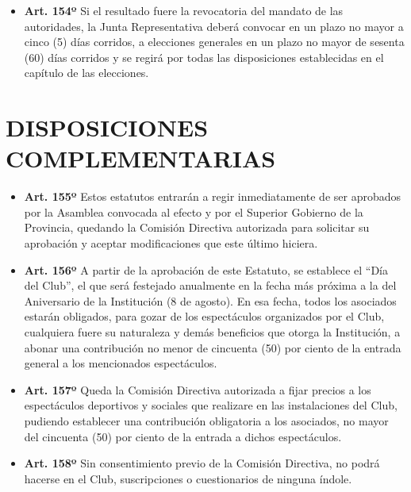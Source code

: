 \documentclass[]{book}
\providecommand{\tightlist}{%
  \setlength{\itemsep}{0pt}\setlength{\parskip}{0pt}}
\begin{document}
\begin{itemize}
\tightlist
\item
  \textbf{Art. 154º}
  Si el resultado fuere la revocatoria del mandato de las autoridades, la Junta Representativa deberá convocar en un plazo no mayor a cinco (5) días corridos, a elecciones generales en un plazo no mayor de sesenta (60) días corridos y se regirá por todas las disposiciones establecidas en el capítulo de las elecciones.
\end{itemize}

\hypertarget{cap26}{%
\chapter{DISPOSICIONES COMPLEMENTARIAS}\label{cap26}}

\begin{itemize}
\tightlist
\item
  \textbf{Art. 155º}
  Estos estatutos entrarán a regir inmediatamente de ser aprobados por la Asamblea convocada al efecto y por el Superior Gobierno de la Provincia, quedando la Comisión Directiva autorizada para solicitar su aprobación y aceptar modificaciones que este último hiciera.
\end{itemize}

\begin{itemize}
\tightlist
\item
  \textbf{Art. 156º}
  A partir de la aprobación de este Estatuto, se establece el ``Día del Club'', el que será festejado anualmente en la fecha más próxima a la del Aniversario de la Institución (8 de agosto). En esa fecha, todos los asociados estarán obligados, para gozar de los espectáculos organizados por el Club, cualquiera fuere su naturaleza y demás beneficios que otorga la Institución, a abonar una contribución no menor de cincuenta (50) por ciento de la entrada general a los mencionados espectáculos.
\end{itemize}

\begin{itemize}
\tightlist
\item
  \textbf{Art. 157º}
  Queda la Comisión Directiva autorizada a fijar precios a los espectáculos deportivos y sociales que realizare en las instalaciones del Club, pudiendo establecer una contribución obligatoria a los asociados, no mayor del cincuenta (50) por ciento de la entrada a dichos espectáculos.
\end{itemize}

\begin{itemize}
\tightlist
\item
  \textbf{Art. 158º}
  Sin consentimiento previo de la Comisión Directiva, no podrá hacerse en el Club, suscripciones o cuestionarios de ninguna índole.
\end{itemize}
\end{document}
